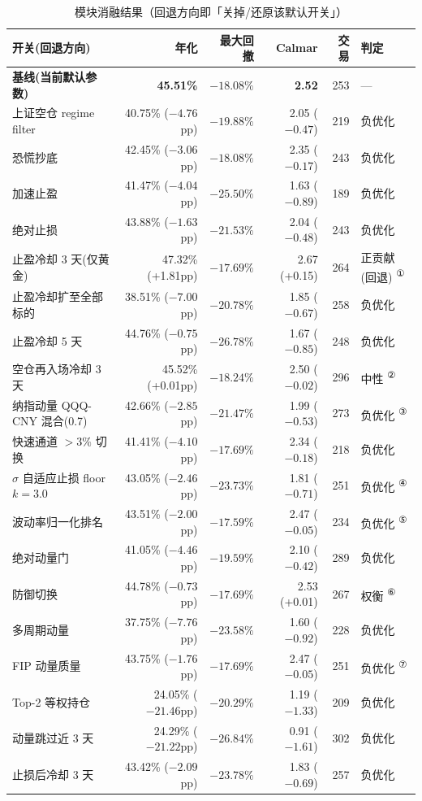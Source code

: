 \documentclass[11pt]{ctexart}
\begin{document}
\begin{table}[htbp]
\centering
\caption{模块消融结果（回退方向即「关掉/还原该默认开关」）}
\small
\begin{tabularx}{\textwidth}{Xrrrrl}
\toprule
开关(回退方向) & 年化 & 最大回撤 & Calmar & 交易 & 判定 \\
\midrule
\textbf{基线(当前默认参数)} & \textbf{45.51\%} & \textbf{$-18.08\%$} & \textbf{2.52} & 253 & — \\
上证空仓 regime filter & 40.75\% ($-4.76$pp) & $-19.88\%$ & 2.05 ($-0.47$) & 219 & 负优化 \\
恐慌抄底 & 42.45\% ($-3.06$pp) & $-18.08\%$ & 2.35 ($-0.17$) & 243 & 负优化 \\
加速止盈 & 41.47\% ($-4.04$pp) & $-25.50\%$ & 1.63 ($-0.89$) & 189 & 负优化 \\
绝对止损 & 43.88\% ($-1.63$pp) & $-21.53\%$ & 2.04 ($-0.48$) & 243 & 负优化 \\
止盈冷却 3 天(仅黄金) & 47.32\% (+1.81pp) & $-17.69\%$ & 2.67 (+0.15) & 264 & 正贡献(回退) \textsuperscript{①} \\
止盈冷却扩至全部标的 & 38.51\% ($-7.00$pp) & $-20.78\%$ & 1.85 ($-0.67$) & 258 & 负优化 \\
止盈冷却 5 天 & 44.76\% ($-0.75$pp) & $-26.78\%$ & 1.67 ($-0.85$) & 248 & 负优化 \\
空仓再入场冷却 3 天 & 45.52\% (+0.01pp) & $-18.24\%$ & 2.50 ($-0.02$) & 296 & 中性 \textsuperscript{②} \\
纳指动量 QQQ-CNY 混合(0.7) & 42.66\% ($-2.85$pp) & $-21.47\%$ & 1.99 ($-0.53$) & 273 & 负优化 \textsuperscript{③} \\
快速通道 $>3\%$ 切换 & 41.41\% ($-4.10$pp) & $-17.69\%$ & 2.34 ($-0.18$) & 218 & 负优化 \\
$\sigma$ 自适应止损 floor $k=3.0$ & 43.05\% ($-2.46$pp) & $-23.73\%$ & 1.81 ($-0.71$) & 251 & 负优化 \textsuperscript{④} \\
波动率归一化排名 & 43.51\% ($-2.00$pp) & $-17.59\%$ & 2.47 ($-0.05$) & 234 & 负优化 \textsuperscript{⑤} \\
绝对动量门 & 41.05\% ($-4.46$pp) & $-19.59\%$ & 2.10 ($-0.42$) & 289 & 负优化 \\
防御切换 & 44.78\% ($-0.73$pp) & $-17.69\%$ & 2.53 (+0.01) & 267 & 权衡 \textsuperscript{⑥} \\
多周期动量 & 37.75\% ($-7.76$pp) & $-23.58\%$ & 1.60 ($-0.92$) & 228 & 负优化 \\
FIP 动量质量 & 43.75\% ($-1.76$pp) & $-17.69\%$ & 2.47 ($-0.05$) & 251 & 负优化 \textsuperscript{⑦} \\
Top-2 等权持仓 & 24.05\% ($-21.46$pp) & $-20.29\%$ & 1.19 ($-1.33$) & 209 & 负优化 \\
动量跳过近 3 天 & 24.29\% ($-21.22$pp) & $-26.84\%$ & 0.91 ($-1.61$) & 302 & 负优化 \\
止损后冷却 3 天 & 43.42\% ($-2.09$pp) & $-23.78\%$ & 1.83 ($-0.69$) & 257 & 负优化 \\
\bottomrule
\end{tabularx}


\end{table}
\end{document}
